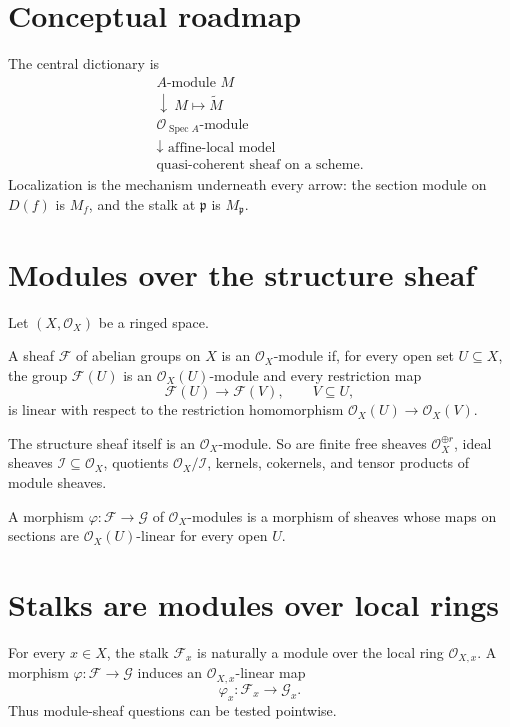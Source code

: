 \section*{Conceptual roadmap}
The central dictionary is
\[
\boxed{
\begin{array}{c}
A\text{-module }M\\[2pt]
\downarrow\ M\mapsto\widetilde M\\[2pt]
\mathcal O_{\operatorname{Spec}A}\text{-module}\\[2pt]
\downarrow\text{ affine-local model}\\[2pt]
\text{quasi-coherent sheaf on a scheme.}
\end{array}}
\]
Localization is the mechanism underneath every arrow: the section module on $D(f)$ is $M_f$, and the stalk at $\mathfrak p$ is $M_{\mathfrak p}$.



\section{Modules over the structure sheaf}
Let $(X,\mathcal O_X)$ be a ringed space.

\begin{definition}
A sheaf $\mathcal F$ of abelian groups on $X$ is an $\mathcal O_X$-module if, for every open set $U\subseteq X$, the group $\mathcal F(U)$ is an $\mathcal O_X(U)$-module and every restriction map
\[
\mathcal F(U)\longrightarrow\mathcal F(V),\qquad V\subseteq U,
\]
is linear with respect to the restriction homomorphism $\mathcal O_X(U)\to\mathcal O_X(V)$.
\end{definition}

The structure sheaf itself is an $\mathcal O_X$-module.  So are finite free sheaves $\mathcal O_X^{\oplus r}$, ideal sheaves $\mathcal I\subseteq\mathcal O_X$, quotients $\mathcal O_X/\mathcal I$, kernels, cokernels, and tensor products of module sheaves.

A morphism $\varphi:\mathcal F\to\mathcal G$ of $\mathcal O_X$-modules is a morphism of sheaves whose maps on sections are $\mathcal O_X(U)$-linear for every open $U$.

\section{Stalks are modules over local rings}
For every $x\in X$, the stalk $\mathcal F_x$ is naturally a module over the local ring $\mathcal O_{X,x}$.  A morphism $\varphi:\mathcal F\to\mathcal G$ induces an $\mathcal O_{X,x}$-linear map
\[
\varphi_x:\mathcal F_x\longrightarrow\mathcal G_x.
\]
Thus module-sheaf questions can be tested pointwise.

